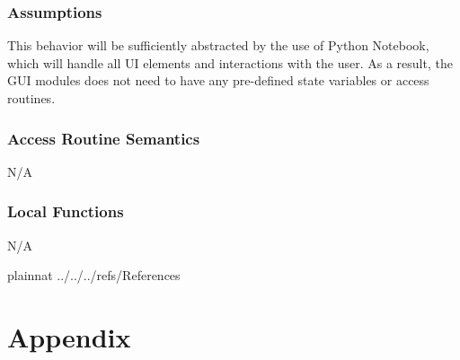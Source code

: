 \documentclass[12pt, titlepage]{article}
\begin{document}

\subsubsection{Assumptions}

This behavior will be sufficiently abstracted by the use of Python Notebook,
which will handle all UI elements and interactions with the user. As a result,
the GUI modules does not need to have any pre-defined state variables or access
routines.

\subsubsection{Access Routine Semantics}

N/A

\subsubsection{Local Functions}

N/A

\newpage

 {plainnat}
 {../../../refs/References}

\newpage

\section{Appendix} \label{Appendix}


\newpage{}
\end{document}
